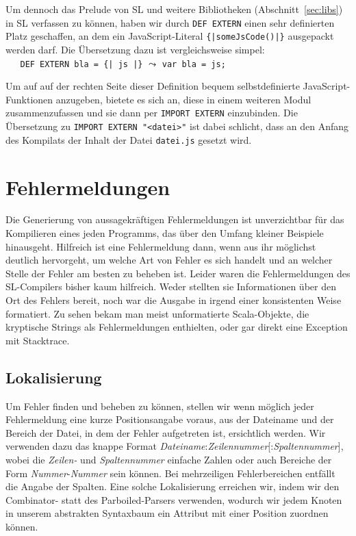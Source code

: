 \documentclass[runningheads]{llncs}
\begin{document}
Um dennoch das Prelude von SL und weitere Bibliotheken (Abschnitt~\ref{sec:libs})
in SL verfassen zu können, haben wir durch \verb|DEF EXTERN| einen sehr
definierten Platz geschaffen, an dem ein Java\-Script-Literal
\verb.{|someJsCode()|}. ausgepackt werden darf. Die Übersetzung dazu ist
vergleichsweise simpel:\\
\verb.   DEF EXTERN bla = {| js |}.
\quad $\leadsto$ \quad \verb|var bla = js;|

Um auf auf der rechten Seite dieser Definition bequem selbstdefinierte
Java\-Script-Funktionen anzugeben, bietete es sich an, diese in einem
weiteren Modul zusammenzufassen und sie dann per \verb|IMPORT EXTERN|
einzubinden. Die Übersetzung zu \verb|IMPORT EXTERN "<datei>"| ist dabei
schlicht, dass an den Anfang des Kompilats der Inhalt der Datei
\verb|datei.js| gesetzt wird.

\section{Fehlermeldungen}
\label{sec:errors}

Die Generierung von aussagekräftigen Fehlermeldungen ist unverzichtbar
für das Kompilieren eines jeden Programms, das über den Umfang kleiner
Beispiele hinausgeht.  Hilfreich ist eine Fehlermeldung dann, wenn aus
ihr möglichst deutlich hervorgeht, um welche Art von Fehler es sich
handelt und an welcher Stelle der Fehler am besten zu beheben ist.
Leider waren die Fehlermeldungen des SL-Compilers bisher kaum
hilfreich.  Weder stellten sie Informationen über den Ort des Fehlers
bereit, noch war die Ausgabe in irgend einer konsistenten Weise
formatiert.  Zu sehen bekam man meist unformatierte Scala-Objekte, die
kryptische Strings als Fehlermeldungen enthielten, oder gar direkt
eine Exception mit Stacktrace.

\subsection{Lokalisierung}
Um Fehler finden und beheben zu können, stellen wir wenn möglich jeder
Fehlermeldung eine kurze Positionsangabe voraus, aus der Dateiname und
der Bereich der Datei, in dem der Fehler aufgetreten ist, ersichtlich
werden.  Wir verwenden dazu das knappe Format
\emph{Dateiname}:\emph{Zeilennummer}[:\emph{Spaltennummer}], wobei die
\emph{Zeilen-} und \emph{Spaltennummer} einfache Zahlen oder auch
Bereiche der Form \emph{Nummer}-\emph{Nummer} sein können.  Bei
mehrzeiligen Fehlerbereichen entfällt die Angabe der Spalten.  Eine
solche Lokalisierung erreichen wir, indem wir den Combinator- statt
des Parboiled-Parsers verwenden, wodurch wir jedem Knoten in unserem
abstrakten Syntaxbaum ein Attribut mit einer Position zuordnen können.
\end{document}
